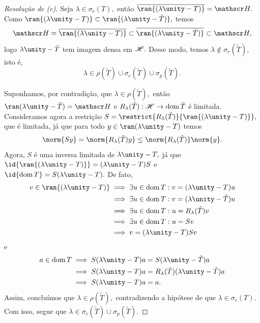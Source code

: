 \begin{proof}[Resolução de (c)]
  Seja \(\lambda \in \sigma_c(T),\) então \( \closure{\ran{(\lambda \unity - T)}} = \hilbert.\) Como \(\ran{(\lambda \unity - T)} \subset \ran{(\lambda \unity - \tilde{T})},\) temos
  \begin{equation*}
    \hilbert = \closure{\ran{(\lambda \unity - T)}} \subset \closure{\ran{(\lambda \unity - \tilde{T})}} \subset \hilbert,
  \end{equation*}
  logo \(\lambda \unity - \tilde{T}\) tem imagem densa em \(\mathscr{H}.\) Desse modo, temos \(\lambda \notin \sigma_r(\tilde{T}),\) isto é,
  \begin{equation*}
      \lambda \in \rho(\tilde{T}) \cup \sigma_c(\tilde{T}) \cup \sigma_p(\tilde{T}).
  \end{equation*}

  Suponhamos, por contradição, que \(\lambda \in \rho(\tilde{T}),\) então \(\ran(\lambda \unity - \tilde{T}) = \hilbert\) e \(R_{\lambda}(\tilde{T}) : \mathscr{H} \to \operatorname{dom}{\tilde{T}}\) é limitada. Consideramos agora a restrição \(S = \restrict{R_{\lambda}(\tilde{T})}{\ran{(\lambda \unity - T)}},\) que é limitada, já que para todo \(y \in \ran(\lambda \unity - T)\) temos
  \begin{equation*}
    \norm{Sy} = \norm{R_{\lambda}(\tilde{T})y} \leq \norm{R_{\lambda}(\tilde{T})} \norm{y}.
  \end{equation*}
  Agora, \(S\) é uma inversa limitada de \(\lambda \unity - T,\) já que \(\id{\ran{(\lambda \unity - T)}} = (\lambda \unity - T) S\) e \(\id{\dom{T}} = S (\lambda \unity - T).\) De fato,
  \begin{align*}
    v \in \ran{(\lambda \unity - T)} &\implies \exists u \in \dom{T} : v = (\lambda \unity - T) u\\
                                     &\implies \exists u \in \dom{T} : v = (\lambda \unity - \tilde{T})u\\
                                     &\implies \exists u \in \dom{T} : u = R_\lambda(\tilde{T}) v\\
                                     &\implies \exists u \in \dom{T} : u = S v\\
                                     &\implies v = (\lambda \unity - T) S v
  \end{align*}
  e
  \begin{align*}
    a \in \dom{T} &\implies S (\lambda\unity - T)a = S (\lambda \unity - \tilde{T}) a\\
                  &\implies S(\lambda \unity - T)a = R_\lambda(\tilde{T}) (\lambda \unity - \tilde{T}) a\\
                  &\implies S(\lambda \unity - T)a = a.
  \end{align*}
  Assim, concluímos que \(\lambda \in \rho(\tilde{T}),\) contradizendo a hipótese de que \(\lambda \in \sigma_c(T).\) Com isso, segue que \(\lambda \in \sigma_c(\tilde{T}) \cup \sigma_p(\tilde{T}).\)
\end{proof}
